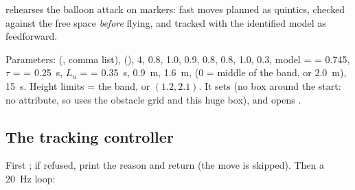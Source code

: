  rehearses the balloon attack on markers: fast moves planned as quintics, checked against the
free space \emph{before} flying, and tracked with the identified model as feedforward.

Parameters:  (, comma list),  (),  4,
 0.8,  1.0,  0.9,  0.8,  0.8,  1.0,
 0.3, model  =  = 0.745, $\tau$ =  = 0.25~s, $L_u$ =  =
0.35~s,  0.9~m,  1.6~m,  (0 = middle of the band, or
2.0~m),  15~s. Height limits  = the band, or $(1.2, 2.1)$. It sets
 (no box around the start: no  attribute, so  uses the obstacle grid and
this huge box), and opens .

\subsection{The tracking controller}

First ; if refused, print the reason and return  (the move
is skipped). Then a 20~Hz loop:

